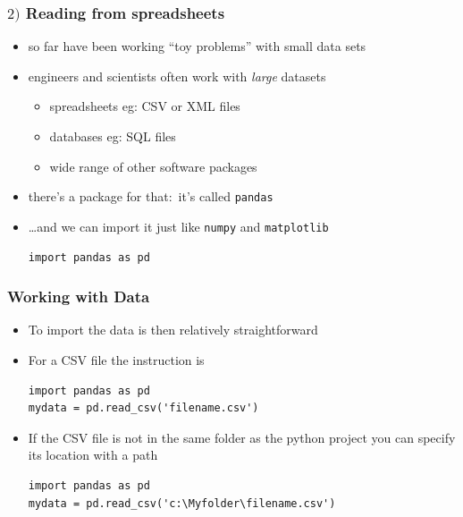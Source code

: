 \documentclass[english,14pt]{beamer}
\begin{document}
\begin{frame}[fragile]

\frametitle{$2)$ Reading from spreadsheets}

\begin{itemize}
    \item so far have been working ``toy problems'' with small data sets
    \item engineers and scientists often work with \emph{large} datasets
        \begin{itemize}
            \item spreadsheets eg: CSV or XML files
            \item databases eg: SQL files 
            \item wide range of other software packages
        \end{itemize}
    \item there's a package for that:~it's called \texttt{pandas}
    \item[] \ldots and we can import it just like \texttt{numpy} and \texttt{matplotlib}
\begin{lstlisting}[style=CStyle]
import pandas as pd
\end{lstlisting}
\end{itemize}

\end{frame}


\begin{frame}[fragile]
\frametitle{Working with Data}
\begin{itemize}
    \item To import the data is then relatively straightforward
    \item For a CSV file the instruction is
\begin{lstlisting}[style=CStyle]
import pandas as pd
mydata = pd.read_csv('filename.csv')
\end{lstlisting}
    \item If the CSV file is not in the same folder as the python project you can specify its location with a path
\begin{lstlisting}[style=CStyle]
import pandas as pd
mydata = pd.read_csv('c:\Myfolder\filename.csv')
\end{lstlisting}
\end{itemize}
\end{frame}

\end{document}
